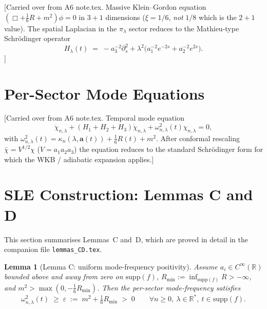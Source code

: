 \documentclass[11pt,a4paper]{article}
\newtheorem{lemma}[theorem]{Lemma}
\theoremstyle{definition}
\newcommand{\R}{\mathbb{R}}
\begin{document}
[Carried over from A6 note.tex.  Massive Klein--Gordon equation
$(\Box + \tfrac{1}{6}R + m^2)\phi = 0$ in $3{+}1$ dimensions
($\xi=1/6$, \emph{not} $1/8$ which is the $2{+}1$ value).
The spatial Laplacian in the $\pi_\lambda$ sector reduces to the Mathieu-type
Schr\"odinger operator
\begin{equation}\label{eq:spatialLap}
  H_\lambda(t)\;=\;-a_3^{-2}\partial_s^2
  + \lambda^2\bigl(a_1^{-2} e^{-2s} + a_2^{-2} e^{2s}\bigr).
\end{equation}]

\section{Per-Sector Mode Equations}
\label{sec:modes}

[Carried over from A6 note.tex.  Temporal mode equation
\begin{equation}\label{eq:mode}
  \ddot\chi_{n,\lambda} + (H_1+H_2+H_3)\dot\chi_{n,\lambda}
  + \omega^2_{n,\lambda}(t)\chi_{n,\lambda} = 0,
\end{equation}
with $\omega^2_{n,\lambda}(t) = \kappa_n(\lambda,\mathbf{a}(t)) + \tfrac{1}{6}R(t) + m^2$.
After conformal rescaling $\bar\chi = V^{1/2}\chi$ ($V=a_1 a_2 a_3$) the equation
reduces to the standard Schr\"odinger form for which the WKB / adiabatic
expansion applies.]

\section{SLE Construction: Lemmas C and D}
\label{sec:sle}

This section summarises Lemmas~C and~D, which are proved in detail in the
companion file \texttt{lemmas\_CD.tex}.

\begin{lemma}[Lemma C: uniform mode-frequency positivity]\label{lem:C}
Assume $a_i\in C^\infty(\R)$ bounded above and away from zero on $\mathrm{supp}(f)$,
$R_{\min} := \inf_{\mathrm{supp}(f)} R > -\infty$, and
$m^2 > \max(0, -\tfrac{1}{6}R_{\min})$.  Then the per-sector mode-frequency
satisfies
\begin{equation}\label{eq:lemC}
  \omega^2_{n,\lambda}(t)\;\geq\;\varepsilon\;:=\;m^2 + \tfrac{1}{6}R_{\min}\;>\;0
  \qquad\forall n\geq 0,\ \lambda\in\R^*,\ t\in\mathrm{supp}(f).
\end{equation}
\end{lemma}
\end{document}

